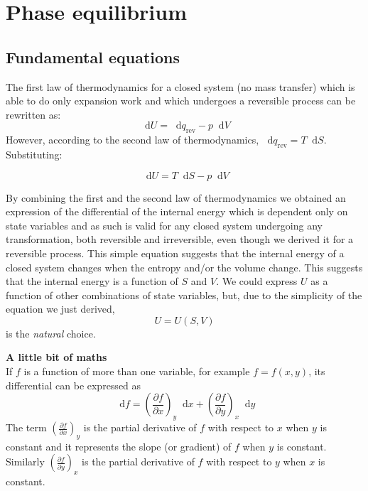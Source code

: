 \documentclass[12pt,a4paper]{report}
\newcommand*\diff{\mathop{}\!\mathrm{d}}
\newif\ifstudents
\begin{document}
   \pagestyle{headings}
   \thispagestyle{plain}
   \newpage
   \noindent
   \begin{center}
   \end{center}
   \section*{Phase equilibrium}
   \subsection*{Fundamental equations}
   The first law of thermodynamics for a closed system (no mass transfer) which is able to do only expansion work and which undergoes a reversible process can be rewritten as:
   \begin{equation*}
   \diff U = \diff q_{\mathrm{rev}} -p \diff V
   \end{equation*}
   However, according to the second law of thermodynamics, $\diff q_{\mathrm{rev}}=T\diff S$. Substituting: 
   \ifstudents \hideit[2]{ \fi
   \begin{equation*}
   \diff U = T\diff S-p \diff V
   \end{equation*}
   \ifstudents } \fi
   By combining the first and the second law of thermodynamics we obtained an expression of the differential of the internal energy which is dependent only on state variables and as such is valid for any closed system undergoing any transformation, both reversible and irreversible, even though we derived it for a reversible process. This simple equation suggests that the internal energy of a closed system changes when the entropy and/or the volume change. This suggests that the internal energy is a function of $S$ and $V$. We could express $U$ as a function of other combinations of state variables, but, due to the simplicity of the equation we just derived,
   \begin{equation*}
   U=U(S,V)
   \end{equation*}
   is the \textit{natural} choice.
   \begin{mdframed}
   \textbf{A little bit of maths}\\
   If $f$ is a function of more than one variable, for example $f=f(x,y)$, its differential can be expressed as 
   \begin{equation*}
   \diff f = \left(\frac{\partial f}{\partial x}\right)_{y} \diff x+\left(\frac{\partial f}{\partial y}\right)_{x} \diff y
   \end{equation*}
   The term $\left(\frac{\partial f}{\partial x}\right)_{y}$ is the partial derivative of $f$ with respect to $x$ when $y$ is constant and it represents the slope (or gradient) of $f$ when $y$ is constant. Similarly $\left(\frac{\partial f}{\partial y}\right)_{x}$ is the partial derivative of $f$ with respect to $y$ when $x$ is constant.
   \end{mdframed}
\end{document}
